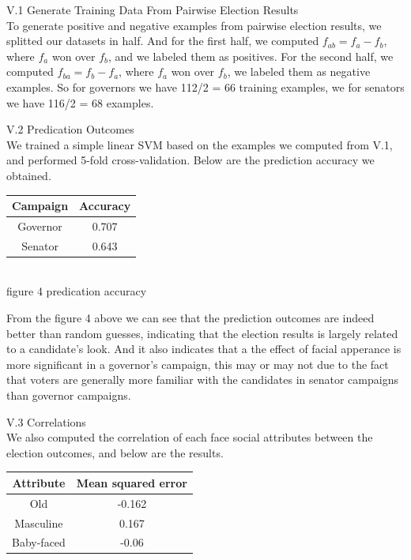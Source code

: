 \documentclass[12pt]{article}
\newenvironment{p4}[2][V Predicting Election Outcomes with Face Social Attributes]{\begin{trivlist}
\item[\hskip \labelsep {\bfseries #1}\hskip \labelsep {\bfseries #2}]}{\end{trivlist}}
\begin{document}
\begin{p4}{}
\item{V.1 Generate Training Data From Pairwise Election Results\\}
To generate positive and negative examples from pairwise election results, we splitted our datasets in half. And for the first half, we computed $f_{ab} = f_a - f_b$, where $f_a$ won over $f_b$, and we labeled them as positives. For the second half, we computed $f_{ba} = f_b - f_a$, where $f_a$ won over $f_b$, we labeled them as negative examples. So for governors we have 112/2 = 66 training examples, we for senators we have 116/2 = 68 examples.\\
\item{V.2 Predication Outcomes\\}
We trained a simple linear SVM based on the examples we computed from V.1, and performed 5-fold cross-validation. Below are the prediction accuracy we obtained.
\begin{center}
	\begin{tabular}{||c c||} 
		\hline
	    Campaign & Accuracy \\
		\hline
		Governor & 0.707\\
		Senator & 0.643\\
		\hline
	\end{tabular}
	{\\figure 4 predication accuracy}
\end{center}
From the figure 4 above we can see that the prediction outcomes are indeed better than random guesses, indicating that the election results is largely related to a candidate's look. And it also indicates that a the effect of facial apperance is more significant in a governor's campaign, this may or may not due to the fact that voters are generally more familiar with the candidates in senator campaigns than governor campaigns.\\
\item{}{V.3 Correlations\\}
We also computed the correlation of each face social attributes between the election outcomes, and below are the results.
\begin{center}
	\begin{tabular}{||c c||} 
		\hline
	    Attribute  & Mean squared error \\
		\hline
		Old & -0.162\\
		\hline
		Masculine & 0.167\\
		\hline
		Baby-faced & -0.06\\

\end{tabular}
\end{center}
\end{p4}
\end{document}
